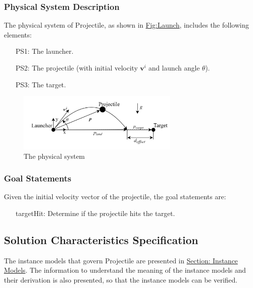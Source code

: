 \documentclass[12pt]{article}
\begin{document}
\subsubsection{Physical System Description}
\label{Sec:PhysSyst}
The physical system of Projectile, as shown in \hyperref[Figure:Launch]{Fig:Launch}, includes the following elements:
\begin{itemize}
\item[PS1:]{The launcher.}
\item[PS2:]{The projectile (with initial velocity ${\mathbf{v}^{i}}$ and launch angle $θ$).}
\item[PS3:]{The target.}
\end{itemize}
\begin{figure}
\begin{center}
\includegraphics[width=0.7\textwidth]{../../../datafiles/Projectile/Launch.jpg}
\caption{The physical system}
\label{Figure:Launch}
\end{center}
\end{figure}
\subsubsection{Goal Statements}
\label{Sec:GoalStmt}
Given the initial velocity vector of the projectile, the goal statements are:
\begin{itemize}
\item[targetHit:\phantomsection\label{targetHit}]{Determine if the projectile hits the target.}
\end{itemize}
\subsection{Solution Characteristics Specification}
\label{Sec:SolCharSpec}
The instance models that govern Projectile are presented in \hyperref[Sec:IMs]{Section: Instance Models}. The information to understand the meaning of the instance models and their derivation is also presented, so that the instance models can be verified.
\end{document}
